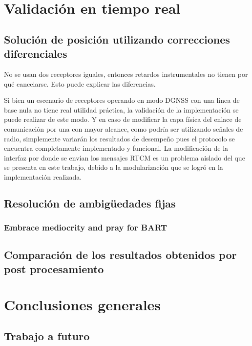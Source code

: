 \documentclass[a4paper,12pt,oneside,onecolumn,final,openright]{book}%
\begin{document}
\chapter{Validación en tiempo real}
\section{Solución de posición utilizando correcciones diferenciales}
	No se usan dos receptores iguales, entonces retardos instrumentales no tienen por qué cancelarse. Esto puede explicar las diferencias.
	
	Si bien un escenario de receptores operando en modo DGNSS con una linea de base nula no tiene real utilidad práctica, la validación de la implementación se puede realizar de este modo. Y en caso de modificar la capa física del enlace de comunicación por una con mayor alcance, como podría ser utilizando señales de radio, simplemente variarán los resultados de desempeño pues el protocolo se encuentra completamente implementado y funcional. La modificación de la interfaz por donde se envían los mensajes RTCM es un problema aislado del que se presenta en este trabajo, debido a la modularización que se logró en la implementación realizada.
\section{Resolución de ambigüedades fijas}
\subsection{Embrace mediocrity and pray for BART}
\section{Comparación de los resultados obtenidos por post procesamiento}
\chapter*{Conclusiones generales}
	
\section*{Trabajo a futuro}
\end{document}
